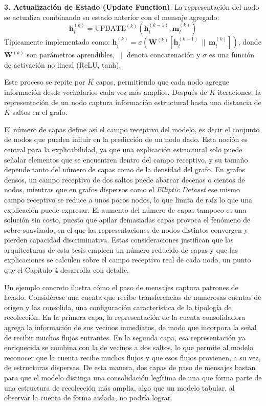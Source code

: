 \textbf{3. Actualización de Estado (Update Function)}: La representación del nodo se actualiza combinando su estado anterior con el mensaje agregado:
\[ \mathbf{h}_i^{(k)} = \text{UPDATE}^{(k)}(\mathbf{h}_i^{(k-1)}, \mathbf{m}_i^{(k)}) \]
Típicamente implementado como: $\mathbf{h}_i^{(k)} = \sigma(\mathbf{W}^{(k)} [\mathbf{h}_i^{(k-1)} \, \| \, \mathbf{m}_i^{(k)}])$, donde $\mathbf{W}^{(k)}$ son parámetros aprendibles, $\|$ denota concatenación y $\sigma$ es una función de activación no lineal (ReLU, tanh).

Este proceso se repite por $K$ capas, permitiendo que cada nodo agregue información desde vecindarios cada vez más amplios. Después de $K$ iteraciones, la representación de un nodo captura información estructural hasta una distancia de $K$ saltos en el grafo.

El número de capas define así el campo receptivo del modelo, es decir el conjunto de nodos que pueden influir en la predicción de un nodo dado. Esta noción es central para la explicabilidad, ya que una explicación estructural solo puede señalar elementos que se encuentren dentro del campo receptivo, y su tamaño depende tanto del número de capas como de la densidad del grafo. En grafos densos, un campo receptivo de dos saltos puede abarcar decenas o cientos de nodos, mientras que en grafos dispersos como el \textit{Elliptic Dataset} ese mismo campo receptivo se reduce a unos pocos nodos, lo que limita de raíz lo que una explicación puede expresar. El aumento del número de capas tampoco es una solución sin costo, puesto que apilar demasiadas capas provoca el fenómeno de sobre-suavizado, en el que las representaciones de nodos distintos convergen y pierden capacidad discriminativa. Estas consideraciones justifican que las arquitecturas de esta tesis empleen un número reducido de capas y que las explicaciones se calculen sobre el campo receptivo real de cada nodo, un punto que el Capítulo 4 desarrolla con detalle.

Un ejemplo concreto ilustra cómo el paso de mensajes captura patrones de lavado. Considérese una cuenta que recibe transferencias de numerosas cuentas de origen y las consolida, una configuración característica de la tipología de recolección. En la primera capa, la representación de la cuenta consolidadora agrega la información de sus vecinos inmediatos, de modo que incorpora la señal de recibir muchos flujos entrantes. En la segunda capa, esa representación ya enriquecida se combina con la de vecinos a dos saltos, lo que permite al modelo reconocer que la cuenta recibe muchos flujos y que esos flujos provienen, a su vez, de estructuras dispersas. De esta manera, dos capas de paso de mensajes bastan para que el modelo distinga una consolidación legítima de una que forma parte de una estructura de recolección más amplia, algo que un modelo tabular, al observar la cuenta de forma aislada, no podría lograr.

